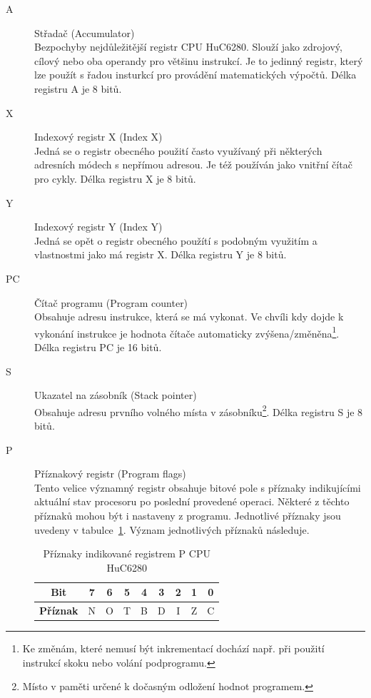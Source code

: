 \begin{description}
\item[{\sf A}] Střadač (Accumulator) \\
	Bezpochyby nejdůležitější registr CPU HuC6280. Slouží jako zdrojový, cílový
	nebo oba operandy pro většinu instrukcí. Je to jedinný registr, který lze
	použít s řadou insturkcí pro provádění matematických výpočtů. Délka
	registru {\sf A} je 8 bitů.

\item[{\sf X}] Indexový registr X (Index X) \\
	Jedná se o registr obecného použití často využívaný při některých adresních
	módech s nepřímou adresou. Je též používán jako vnitřní čítač pro cykly.
	Délka registru {\sf X} je 8 bitů.

\item[{\sf Y}] Indexový registr Y (Index Y) \\
	Jedná se opět o registr obecného použítí s podobným využitím a vlastnostmi
	jako má registr {\sf X}. Délka registru {\sf Y} je 8 bitů.

\item[{\sf PC}] Čítač programu (Program counter) \\
	Obsahuje adresu instrukce, která se má vykonat. Ve chvíli kdy dojde k
	vykonání instrukce je hodnota čítače automaticky
	zvýšena/změněna\footnote{Ke změnám, které nemusí být inkrementací dochází
	např. při použití instrukcí skoku nebo volání podprogramu.}. Délka registru
	{\sf PC} je 16 bitů.

\item[{\sf S}] Ukazatel na zásobník (Stack pointer) \\
	Obsahuje adresu prvního volného místa v zásobníku\footnote{Místo v paměti
	určené k dočasným odložení hodnot programem.}. Délka registru {\sf S} je 8
	bitů.

\item[{\sf P}] Příznakový registr (Program flags) \\
	Tento velice významný registr obsahuje bitové pole s příznaky indikujícími
	aktuální stav procesoru po poslední provedené operaci. Některé z těchto
	příznaků mohou být i nastaveny z programu. Jednotlivé příznaky jsou uvedeny
	v tabulce~\ref{tab:cpu_flags}. Význam jednotlivých příznaků následuje.

	\begin{table}[ht]
	\begin{center}
	\begin{tabular}{|c|c|c|c|c|c|c|c|c|}
	\hline
	\textbf{Bit} & 7 & 6 & 5 & 4 & 3 & 2 & 1 & 0 \\
	\hline
	\textbf{Příznak} & N & O & T & B & D & I & Z & C \\
	\hline
	\end{tabular}
	\end{center}
	\caption{Příznaky indikované registrem P CPU HuC6280\label{tab:cpu_flags}}
	\end{table}


\end{description}
